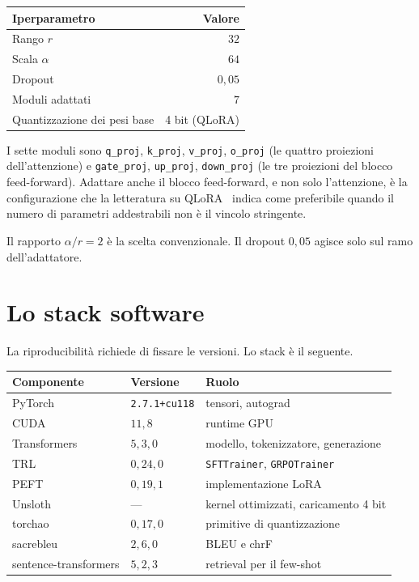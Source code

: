 \begin{center}
\begin{tabular}{lr}
\toprule
Iperparametro & Valore \\
\midrule
Rango $r$ & $32$ \\
Scala $\alpha$ & $64$ \\
Dropout & $0{,}05$ \\
Moduli adattati & $7$ \\
Quantizzazione dei pesi base & 4 bit (QLoRA) \\
\bottomrule
\end{tabular}
\end{center}

I sette moduli sono \texttt{q\_proj}, \texttt{k\_proj}, \texttt{v\_proj},
\texttt{o\_proj} (le quattro proiezioni dell'attenzione) e \texttt{gate\_proj},
\texttt{up\_proj}, \texttt{down\_proj} (le tre proiezioni del blocco
feed-forward). Adattare anche il blocco feed-forward, e non solo l'attenzione, è
la configurazione che la letteratura su QLoRA~\cite{dettmers2023qlora} indica
come preferibile quando il numero di parametri addestrabili non è il vincolo
stringente.

Il rapporto $\alpha/r = 2$ è la scelta convenzionale. Il dropout $0{,}05$ agisce
solo sul ramo dell'adattatore.

\section{Lo stack software}

La riproducibilità richiede di fissare le versioni. Lo stack è il seguente.

\begin{center}
\begin{tabular}{lll}
\toprule
Componente & Versione & Ruolo \\
\midrule
PyTorch & \texttt{2.7.1+cu118} & tensori, autograd \\
CUDA & $11{,}8$ & runtime GPU \\
Transformers & $5{,}3{,}0$ & modello, tokenizzatore, generazione \\
TRL & $0{,}24{,}0$ & \texttt{SFTTrainer}, \texttt{GRPOTrainer} \\
PEFT & $0{,}19{,}1$ & implementazione LoRA \\
Unsloth & --- & kernel ottimizzati, caricamento 4 bit \\
torchao & $0{,}17{,}0$ & primitive di quantizzazione \\
sacrebleu & $2{,}6{,}0$ & BLEU e chrF \\
sentence-transformers & $5{,}2{,}3$ & retrieval per il few-shot \\
\bottomrule
\end{tabular}
\end{center}

